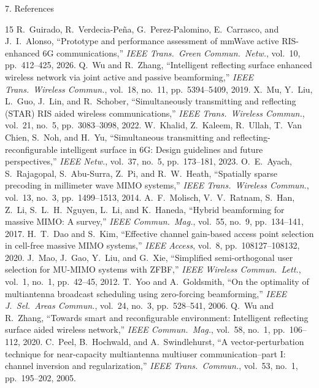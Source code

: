 \documentclass[aspectratio=169,11pt]{beamer}
\begin{document}
\begin{frame}{7. References}
\fontsize{6.1pt}{7.15pt}\selectfont
\begin{thebibliography}{15}
R.~Guirado, R.~Verdecia-Pe\~{n}a, G.~Perez-Palomino, E.~Carrasco, and J.~I.~Alonso,
``Prototype and performance assessment of mmWave active RIS-enhanced 6G communications,''
\textit{IEEE Trans.\ Green Commun.\ Netw.}, vol.~10, pp.~412--425, 2026.
Q.~Wu and R.~Zhang,
``Intelligent reflecting surface enhanced wireless network via joint active and passive beamforming,''
\textit{IEEE Trans.\ Wireless Commun.}, vol.~18, no.~11, pp.~5394--5409, 2019.
X.~Mu, Y.~Liu, L.~Guo, J.~Lin, and R.~Schober,
``Simultaneously transmitting and reflecting (STAR) RIS aided wireless communications,''
\textit{IEEE Trans.\ Wireless Commun.}, vol.~21, no.~5, pp.~3083--3098, 2022.
W.~Khalid, Z.~Kaleem, R.~Ullah, T.~Van Chien, S.~Noh, and H.~Yu,
``Simultaneous transmitting and reflecting-reconfigurable intelligent surface in 6G: Design guidelines and future perspectives,''
\textit{IEEE Netw.}, vol.~37, no.~5, pp.~173--181, 2023.
O.~E.~Ayach, S.~Rajagopal, S.~Abu-Surra, Z.~Pi, and R.~W.~Heath,
``Spatially sparse precoding in millimeter wave MIMO systems,''
\textit{IEEE Trans.\ Wireless Commun.}, vol.~13, no.~3, pp.~1499--1513, 2014.
A.~F.~Molisch, V.~V.~Ratnam, S.~Han, Z.~Li, S.~L.~H.~Nguyen, L.~Li, and K.~Haneda,
``Hybrid beamforming for massive MIMO: A survey,''
\textit{IEEE Commun.\ Mag.}, vol.~55, no.~9, pp.~134--141, 2017.
H.~T.~Dao and S.~Kim,
``Effective channel gain-based access point selection in cell-free massive MIMO systems,''
\textit{IEEE Access}, vol.~8, pp.~108127--108132, 2020.
J.~Mao, J.~Gao, Y.~Liu, and G.~Xie,
``Simplified semi-orthogonal user selection for MU-MIMO systems with ZFBF,''
\textit{IEEE Wireless Commun.\ Lett.}, vol.~1, no.~1, pp.~42--45, 2012.
T.~Yoo and A.~Goldsmith,
``On the optimality of multiantenna broadcast scheduling using zero-forcing beamforming,''
\textit{IEEE J.\ Sel.\ Areas Commun.}, vol.~24, no.~3, pp.~528--541, 2006.
Q.~Wu and R.~Zhang,
``Towards smart and reconfigurable environment: Intelligent reflecting surface aided wireless network,''
\textit{IEEE Commun.\ Mag.}, vol.~58, no.~1, pp.~106--112, 2020.
C.~Peel, B.~Hochwald, and A.~Swindlehurst,
``A vector-perturbation technique for near-capacity multiantenna multiuser communication--part I: channel inversion and regularization,''
\textit{IEEE Trans.\ Commun.}, vol.~53, no.~1, pp.~195--202, 2005.
\end{thebibliography}
\end{frame}
\end{document}

